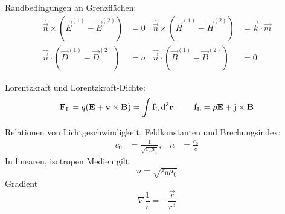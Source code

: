 Randbedingungen an Grenzflächen:
\begin{align*}
	\hat{\vec n}\times(\vec E^{(1)}-\vec E^{(2)}) & = 0      & \hat{\vec n}\times(\vec H^{(1)}-\vec H^{(2)}) & = \vec k\cdot \vec m \\
	\hat{\vec n}\cdot(\vec D^{(1)}-\vec D^{(2)})  & = \sigma & \hat{\vec n}\cdot(\vec B^{(1)}-\vec B^{(2)})  & = 0
\end{align*}

Lorentzkraft und Lorentzkraft-Dichte:
\begin{align*}
	\vec F_\text{L} = q(\vec E+\vec v\times \vec B) = \int \vec f_\text{L}\diffa[3]{\vec r}, \qquad \vec f_\text{L}=\rho\vec E+\vec j\times \vec B
\end{align*}

Relationen von Lichtgeschwindigkeit, Feldkonstanten und Brechungsindex:
\begin{align*}
	c_{0} & =\frac{1}{\sqrt{\varepsilon _{0}\mu _{0}}} , & n & =\frac{c_{0}}{c}
\end{align*}
In linearen, isotropen Medien gilt
\begin{equation*}
	n=\sqrt{\varepsilon _{0}\mu _{0}}
\end{equation*}
Gradient
\begin{equation*}
	\nabla \frac{1}{r}=-\frac{\vec {r}}{r^{3}}
\end{equation*}

